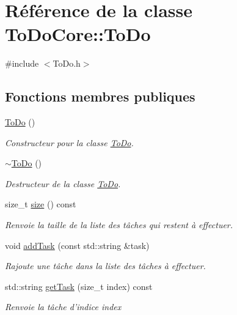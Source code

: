 \hypertarget{class_to_do_core_1_1_to_do}{\section{Référence de la classe To\+Do\+Core\+:\+:To\+Do}
\label{class_to_do_core_1_1_to_do}
}


{\ttfamily \#include $<$To\+Do.\+h$>$}

\subsection*{Fonctions membres publiques}
\begin{DoxyCompactItemize}
\item 
\hyperlink{class_to_do_core_1_1_to_do_aef293d618ec7f7ef5024655f9ee58554}{To\+Do} ()
\begin{DoxyCompactList}\small\item\em Constructeur pour la classe \hyperlink{class_to_do_core_1_1_to_do}{To\+Do}. \end{DoxyCompactList}\item 
\hyperlink{class_to_do_core_1_1_to_do_af97c39227f065a40b8fb036558dd1186}{$\sim$\+To\+Do} ()
\begin{DoxyCompactList}\small\item\em Destructeur de la classe \hyperlink{class_to_do_core_1_1_to_do}{To\+Do}. \end{DoxyCompactList}\item 
size\+\_\+t \hyperlink{class_to_do_core_1_1_to_do_af1d907e8fd8a2b2f6de715fe5b2844b8}{size} () const 
\begin{DoxyCompactList}\small\item\em Renvoie la taille de la liste des tâches qui restent à effectuer. \end{DoxyCompactList}\item 
void \hyperlink{class_to_do_core_1_1_to_do_a51d4e753513c859832cc2222dbcd3755}{add\+Task} (const std\+::string \&task)
\begin{DoxyCompactList}\small\item\em Rajoute une tâche dans la liste des tâches à effectuer. \end{DoxyCompactList}\item 
std\+::string \hyperlink{class_to_do_core_1_1_to_do_a9f8c02d8e64ccc6566a4c87b2dbfcabf}{get\+Task} (size\+\_\+t index) const 
\begin{DoxyCompactList}\small\item\em Renvoie la tâche d'indice {\ttfamily index} \end{DoxyCompactList}\end{DoxyCompactItemize}


